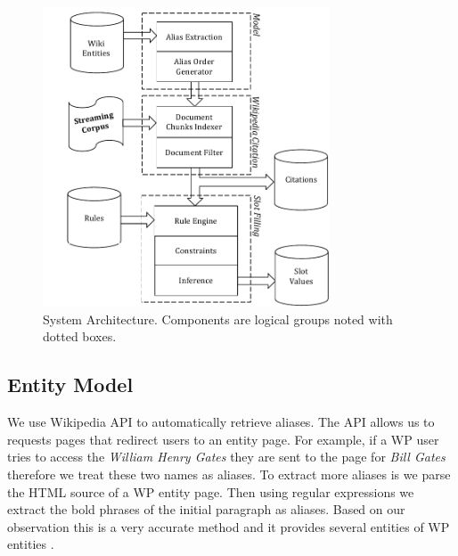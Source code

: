 \begin{figure}
\hspace{-10mm}
  \centering
  \includegraphics[width=8.5cm]{./images/System_Diagram_with_model_Vertical-crop.pdf}
  \vspace*{-.1in} 
  \caption{System Architecture.
  Components are logical groups noted with dotted boxes.}
  \label{fig:system}
  \vspace*{-.2in}
\end{figure}



\subsection{Entity Model}

We use Wikipedia API to automatically retrieve aliases. 
The API allows us to requests pages that redirect users to an entity page.
For example, if a WP user tries to access the \textsl{William Henry Gates} they are sent to the page for 
\textsl{Bill Gates} therefore we treat these two names as aliases. 
To extract more aliases  is we parse the HTML source of a WP entity page.
Then using regular expressions we extract the bold phrases of the initial paragraph as aliases.
Based on our observation this is a very accurate method and it provides several entities of 
WP entities .

